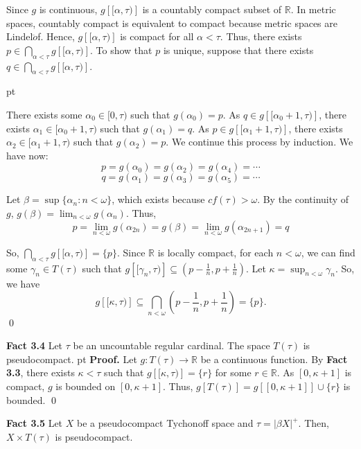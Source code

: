 \documentclass{article}
\begin{document}
\vskip 15pt

Since $g$ is continuous, $g\left[[\alpha, \tau)\right]$ is a countably compact subset of $\mathbb{R}$. In metric spaces, countably compact is equivalent to compact because metric spaces are Lindel$\ddot{o}$f. Hence, $g\left[[\alpha,\tau)\right]$ is compact for all $\alpha<\tau$. 
Thus, there exists $p \in \bigcap_{\alpha<\tau} g\left[[\alpha, \tau)\right]$. To show that $p$ is unique, suppose that there exists $q \in \bigcap_{\alpha<\tau} g\left[[\alpha, \tau)\right]$. 

 pt

There exists some $\alpha_0 \in [0,\tau)$ such that $g(\alpha_0)=p$. As $q\in g\left[[\alpha_0+1,\tau)\right]$, there exists $\alpha_1\in [\alpha_0+1,\tau)$ such that $g(\alpha_1)=q.$ As $p\in g\left[[\alpha_1+1,\tau)\right]$, there exists $\alpha_2\in [\alpha_1+1,\tau)$ such that $g(\alpha_2)=p.$ We continue this process by induction. We have now: 
$$p=g(\alpha_0)=g(\alpha_2)=g(\alpha_4)=\cdots$$
$$q=g(\alpha_1)=g(\alpha_3)=g(\alpha_5)=\cdots$$

Let $\beta=\sup\{\alpha_n: n<\omega\}$, which exists because $cf(\tau)>\omega$. By the continuity of $g$, $g(\beta)=\lim_{n<\omega} g(\alpha_n)$. Thus, 
$$p=\lim_{n<\omega} g(\alpha_{2n})=g(\beta)=\lim_{n<\omega} g(\alpha_{2n+1})=q$$

\vskip 10pt

So, $\bigcap_{\alpha<\tau} g\left[[\alpha, \tau)\right]=\{p\}$. Since $\mathbb{R}$ is locally compact, for each $n<\omega$, we can find some $\gamma_n\in T(\tau)$ such that $g\left[[\gamma_n,\tau)\right] \subseteq (p-\frac{1}{n}, p+\frac{1}{n}).$ Let $\kappa=\sup_{n<\omega} \gamma_n$. So, we have 
		  $$g\left[[\kappa, \tau)\right] \subseteq \bigcap_{n<\omega} (p-\frac{1}{n}, p+\frac{1}{n})=\{p\}.$$\qed


\vskip 40pt

\textbf{Fact 3.4} Let $\tau$ be an uncountable regular cardinal. The space $T(\tau)$ is pseudocompact.
 pt
\textbf{Proof.} Let $g: T(\tau) \rightarrow \mathbb{R}$ be a continuous function. 
By \textbf{Fact 3.3}, there exists $\kappa <\tau$ such that $g \left[ [\kappa, \tau) \right]=\{r\}$ for some $r\in \mathbb{R}$. As $[0,\kappa +1]$ is compact, $g$ is bounded on $[0,\kappa +1]$. Thus, $g[T(\tau)]=g[[0, \kappa +1]]\cup \{r\}$ is bounded. \qed


\vskip 40pt

\textbf{Fact 3.5} Let $X$ be a pseudocompact Tychonoff space and $\tau=|\beta X|^+$. Then,  $X\times T(\tau)$ is pseudocompact.
\vskip 20pt
\end{document}

